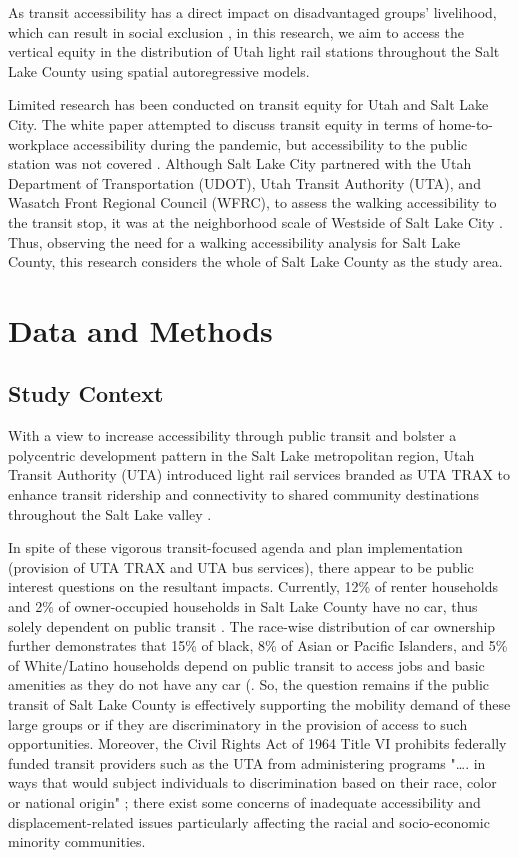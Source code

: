\documentclass[numbered]{trbunofficial}
\begin{document}
As transit accessibility has a direct impact on disadvantaged groups’ livelihood, which can result in social exclusion \cite{DiCiommo2017}, in this research, we aim to access the vertical equity in the distribution of Utah light rail stations throughout the Salt Lake County using spatial autoregressive models.

Limited research has been conducted on transit equity for Utah and Salt Lake City. The white paper attempted to discuss transit equity in terms of home-to-workplace accessibility during the pandemic, but accessibility to the public station was not covered \cite{Loayza2022}. Although Salt Lake City partnered with the Utah Department of Transportation (UDOT), Utah Transit Authority (UTA), and Wasatch Front Regional Council (WFRC), to assess the walking accessibility to the transit stop, it was at the neighborhood scale of Westside of Salt Lake City \cite{SLC2021}. Thus, observing the need for a walking accessibility analysis for Salt Lake County, this research considers the whole of Salt Lake County as the study area.

\section{Data and Methods}

\subsection{Study Context}
With a view to increase accessibility through public transit and bolster a polycentric development pattern in the Salt Lake metropolitan region, Utah Transit Authority (UTA) introduced light rail services branded as UTA TRAX to enhance transit ridership and connectivity to shared community destinations throughout the Salt Lake valley \cite{UtahTransitAuthority2022}.

In spite of these vigorous transit-focused agenda and plan implementation (provision of UTA TRAX and UTA bus services), there appear to be public interest questions on the resultant impacts. Currently, 12\% of renter households and 2\% of owner-occupied households in Salt Lake County have no car, thus solely dependent on public transit \cite{U.S.CensusBureau2019}.  The race-wise distribution of car ownership further demonstrates that 15\% of black, 8\% of Asian or Pacific Islanders, and 5\% of White/Latino households depend on public transit to access jobs and basic amenities as they do not have any car (\cite{PolicyLink2019}. So, the question remains if the public transit of Salt Lake County is effectively supporting the mobility demand of these large groups or if they are discriminatory in the provision of access to such opportunities. Moreover, the Civil Rights Act of 1964 Title VI prohibits federally funded transit providers such as the UTA from administering programs "…. in ways that would subject individuals to discrimination based on their race, color or national origin" \cite{Farber2014}; there exist some concerns of inadequate accessibility and displacement-related issues particularly affecting the racial and socio-economic minority communities.
\end{document}
